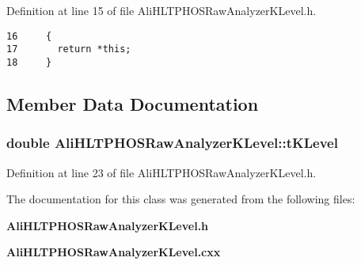 Definition at line 15 of file Ali\-HLTPHOSRaw\-Analyzer\-KLevel.h.

\footnotesize\begin{verbatim}16     {
17       return *this; 
18     }
\end{verbatim}\normalsize 




\subsection{Member Data Documentation}
\subsubsection{\setlength{\rightskip}{0pt plus 5cm}double {\bf Ali\-HLTPHOSRaw\-Analyzer\-KLevel::t\-KLevel}\hspace{0.3cm}{\tt  [private]}}\label{classAliHLTPHOSRawAnalyzerKLevel_r0}




Definition at line 23 of file Ali\-HLTPHOSRaw\-Analyzer\-KLevel.h.

The documentation for this class was generated from the following files:\begin{CompactItemize}
\item 
{\bf Ali\-HLTPHOSRaw\-Analyzer\-KLevel.h}\item 
{\bf Ali\-HLTPHOSRaw\-Analyzer\-KLevel.cxx}\end{CompactItemize}
